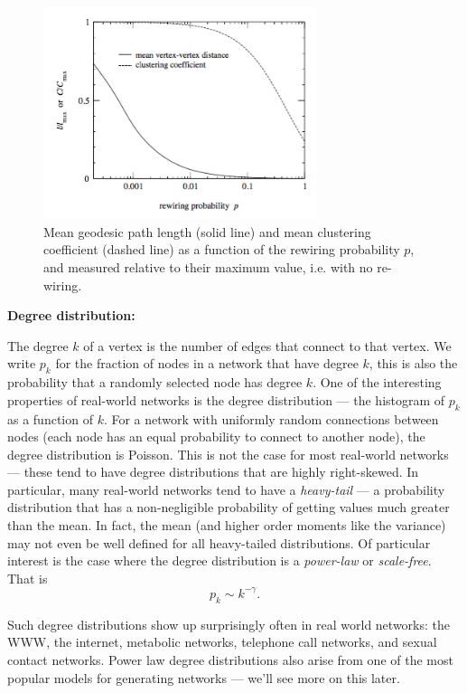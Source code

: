 \documentclass{article}
\begin{document}
\begin{figure}
	\begin{center}
		\includegraphics[width = 8cm]{smallWorld.png}
	\end{center}
	\caption{Mean geodesic path length (solid line) and mean clustering coefficient (dashed line) as a function of the rewiring probability $p$, and measured relative to their maximum value, i.e. with no re-wiring.}
	\label{fig2}
\end{figure}


{\bf Degree distribution:}

The degree $k$ of a vertex is the number of edges that connect to that vertex. We write $p_k$ for the fraction of nodes in a network that have degree $k$, this is also the probability that a randomly selected node has degree $k$. One of the interesting properties of real-world networks is the degree distribution --- the histogram of $p_k$ as a function of $k$. For a network with uniformly random connections between nodes (each node has an equal probability to connect to another node), the degree distribution is Poisson. This is not the case for most real-world networks --- these tend to have degree distributions that are highly right-skewed. In particular, many real-world networks tend to have a \emph{heavy-tail} --- a probability distribution that has a non-negligible probability of getting values much greater than the mean. In fact, the mean (and higher order moments like the variance) may not even be well defined for all heavy-tailed distributions.  Of particular interest is the case where the degree distribution is a \emph{power-law} or \emph{scale-free}. That is
$$
 p_k \sim k^{-\gamma}.
$$

Such degree distributions show up surprisingly often in real world networks: the WWW, the internet, metabolic networks, telephone call networks, and sexual contact networks. Power law degree distributions also arise from one of the most popular models for generating networks --- we'll see more on this later.
\end{document}
